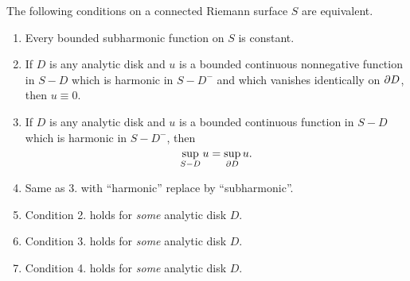\documentclass[a4paper,11pt]{article}
\begin{document}
\begin{propn}
  \label{propn:15}
  The following conditions on a connected Riemann surface $S$ are
  equivalent.
  \begin{enumerate}
  \item Every bounded subharmonic function on $S$ is constant.
  \item If $D$ is any analytic disk and $u$ is a bounded continuous
    nonnegative function in $S - D$ which is harmonic in $S - D^-$ and
    which vanishes identically on $\partial D$, then $u \equiv 0$.
  \item If $D$ is any analytic disk and $u$ is a bounded continuous
    function in $S - D$ which is harmonic in $S-D^-$, then
    $$
    \sup_{S-D} u = \sup_{\partial D} u.
    $$
  \item Same as 3. with ``harmonic'' replace by ``subharmonic''.
  \item Condition 2. holds for \emph{some} analytic disk $D$.
  \item Condition 3. holds for \emph{some} analytic disk $D$.
  \item Condition 4. holds for \emph{some} analytic disk $D$.
  \end{enumerate}
\end{propn}
\end{document}
